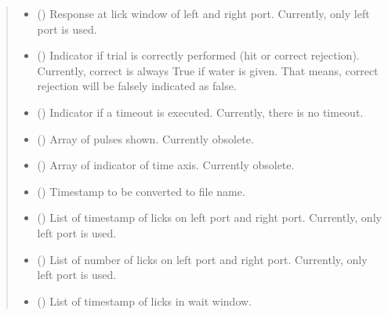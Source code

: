 \documentclass[letterpaper,10pt,english]{sphinxmanual}
\begin{document}
\begin{fulllineitems}
\begin{fulllineitems}
\begin{quote}
\begin{description}
\begin{itemize}
\item {} 
\sphinxAtStartPar
{} () \textendash{} Response at lick window of left and right port. Currently, only left
port is used.

\item {} 
\sphinxAtStartPar
{} () \textendash{} Indicator if trial is correctly performed (hit or correct
rejection). Currently, correct is always True if water is given.
That means, correct rejection will be falsely indicated as false.

\item {} 
\sphinxAtStartPar
{} () \textendash{} Indicator if a timeout is executed. Currently, there is no timeout.

\item {} 
\sphinxAtStartPar
{} () \textendash{} Array of pulses shown. Currently obsolete.

\item {} 
\sphinxAtStartPar
{} () \textendash{} Array of indicator of time axis. Currently obsolete.

\item {} 
\sphinxAtStartPar
{} () \textendash{} Timestamp to be converted to file name.

\item {} 
\sphinxAtStartPar
{} () \textendash{} List of timestamp of licks on left port and right port. Currently,
only left port is used.

\item {} 
\sphinxAtStartPar
{} () \textendash{} List of number of licks on left port and right port. Currently,
only left port is used.

\item {} 
\sphinxAtStartPar
{} () \textendash{} List of timestamp of licks in wait window.


\end{itemize}
\end{description}
\end{quote}
\end{fulllineitems}
\end{fulllineitems}
\end{document}

